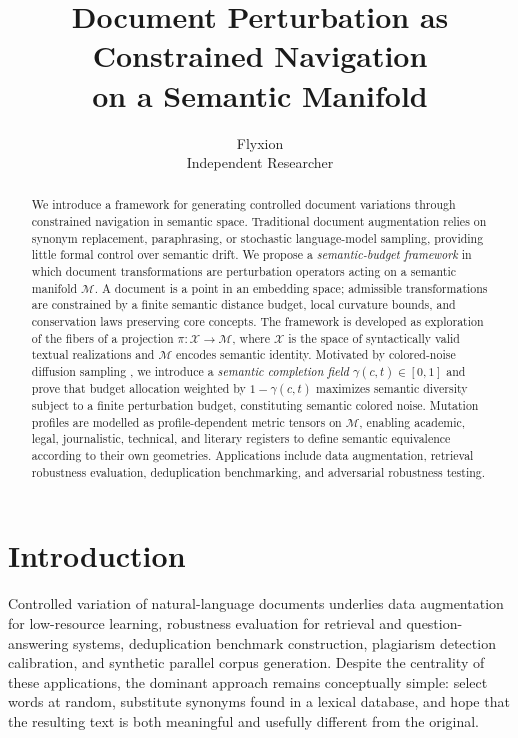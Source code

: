 \documentclass[12pt, a4paper]{article}
\title{\textbf{Document Perturbation as Constrained Navigation\\
on a Semantic Manifold}}
\author{Flyxion\\
\small Independent Researcher}
\date{}
\theoremstyle{plain}
\theoremstyle{definition}
\theoremstyle{remark}
\newcommand{\calX}{\mathcal{X}}
\newcommand{\calM}{\mathcal{M}}
\newcommand{\vpi}{\pi}
\begin{document}
\maketitle
\thispagestyle{empty}

\begin{abstract}
\noindent
We introduce a framework for generating controlled document variations through
constrained navigation in semantic space.  Traditional document augmentation
relies on synonym replacement, paraphrasing, or stochastic language-model
sampling, providing little formal control over semantic drift.  We propose
a \emph{semantic-budget framework} in which document transformations are
perturbation operators acting on a semantic manifold $\calM$.  A document is
a point in an embedding space; admissible transformations are constrained by
a finite semantic distance budget, local curvature bounds, and conservation
laws preserving core concepts.  The framework is developed as exploration of
the fibers of a projection $\vpi : \calX \to \calM$, where $\calX$ is the
space of syntactically valid textual realizations and $\calM$ encodes semantic
identity.  Motivated by colored-noise diffusion sampling
\cite{davidson2026colorednoisediffusionsampling}, we introduce a
\emph{semantic completion field} $\gamma(c, t) \in [0,1]$ and prove that
budget allocation weighted by $1 - \gamma(c, t)$ maximizes semantic diversity
subject to a finite perturbation budget, constituting semantic colored noise.
Mutation profiles are modelled as profile-dependent metric tensors on $\calM$,
enabling academic, legal, journalistic, technical, and literary registers to
define semantic equivalence according to their own geometries.  Applications
include data augmentation, retrieval robustness evaluation, deduplication
benchmarking, and adversarial robustness testing.
\end{abstract}

\newpage
\tableofcontents
\newpage

\section{Introduction}
\label{sec:intro}

Controlled variation of natural-language documents underlies data augmentation
for low-resource learning, robustness evaluation for retrieval and
question-answering systems, deduplication benchmark construction, plagiarism
detection calibration, and synthetic parallel corpus generation.  Despite the
centrality of these applications, the dominant approach remains conceptually
simple: select words at random, substitute synonyms found in a lexical database,
and hope that the resulting text is both meaningful and usefully different from
the original.
\end{document}
